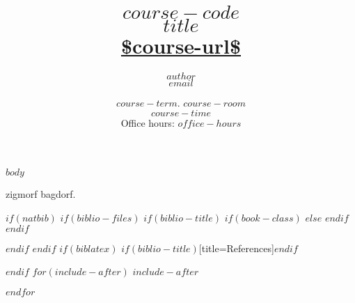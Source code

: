 \documentclass[10pt,letterpaper,article,oneside]{memoir}
\begin{document}
\title{\LARGE {\normalsize \textsc{$course-code$}\\} \HUGE $title$ \\
  \Large\url{$course-url$}}     
\author{\Large $author$\\ \small\texttt{\noindent $email$}}
\date{$course-term$. $course-room$ \\ $course-time$ \\ \small Office hours: $office-hours$} 

\maketitle

$body$

zigmorf bagdorf.

\newpage

$if(natbib)$
$if(biblio-files)$
$if(biblio-title)$
$if(book-class)$
\renewcommand\bibname{Bibliography}
$else$
\renewcommand\refname{References}
$endif$
$endif$


$endif$
$endif$
$if(biblatex)$
\printbibliography$if(biblio-title)$[title=References]$endif$

$endif$
$for(include-after)$
$include-after$

$endfor$
\end{document}
